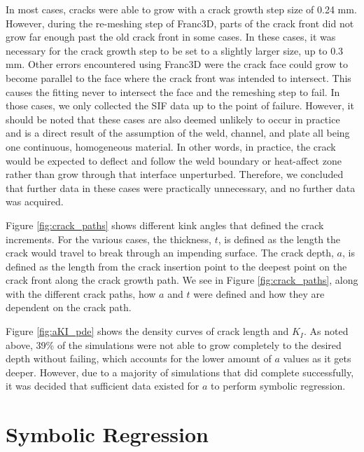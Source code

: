 In most cases, cracks were able to grow with a crack growth step size of
0.24 mm. However, during the re-meshing step of Franc3D, parts of the crack front
did not grow far enough past the old crack front in some cases. In these cases,
it was necessary for the crack growth step to be set to a slightly larger size,
up to 0.3 mm.  Other errors encountered using Franc3D were the crack face could
grow to become parallel to the face where the crack front was intended to
intersect. This causes the fitting never to intersect the face and the remeshing
step to fail.  In those cases, we only collected the SIF data up to
the point of failure. However, it should be noted that these cases are also
deemed unlikely to occur in practice and is a direct result of the assumption of
the weld, channel, and plate all being one continuous, homogeneous material.  In
other words, in practice, the crack would be expected to deflect and follow the
weld boundary or heat-affect zone rather than grow through that interface
unperturbed.  Therefore, we concluded that further data in these cases were
practically unnecessary, and no further data was acquired.

Figure \ref{fig:crack_paths} shows different kink angles that defined the crack
increments. For the various cases, the thickness, $t$, is defined as the length the crack would travel to break through an impending surface. The crack
depth, $a$, is defined as the length from the crack insertion point to the deepest point on the crack front along the crack growth path. We see in Figure \ref{fig:crack_paths}, along with the different crack paths, how $a$ and $t$ were defined and how they are dependent on the crack path.

Figure \ref{fig:aKI_pde} shows the density curves of crack length and $K_I$. As noted above, 39\% of the
simulations were not able to grow completely to the desired depth without
failing, which accounts for the lower amount of $a$ values as it gets deeper.
However, due to a majority of simulations that did complete successfully, it was
decided that sufficient data existed for $a$ to perform symbolic regression. 

\section{Symbolic Regression}\label{symbolic_regression}

